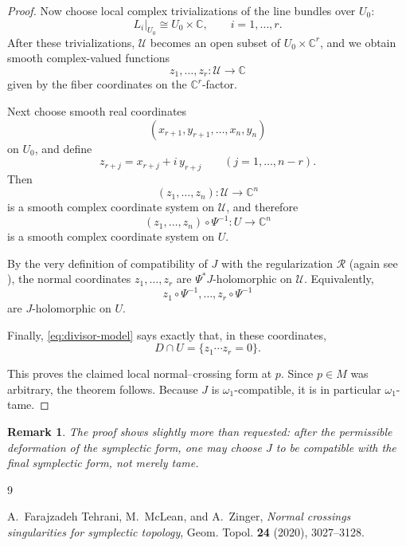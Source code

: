 \documentclass[11pt]{article}
\newtheorem{remark}[theorem]{Remark}
\begin{document}
\begin{proof}
Now choose local complex trivializations of the line bundles over $U_0$:
\[
L_i|_{U_0}\cong U_0\times \mathbb C,\qquad i=1,\dots,r.
\]
After these trivializations, $\mathcal U$ becomes an open subset of
$U_0\times \mathbb C^r$, and we obtain smooth complex-valued functions
\[
z_1,\dots,z_r\colon \mathcal U\to \mathbb C
\]
given by the fiber coordinates on the $\mathbb C^r$-factor.

Next choose smooth real coordinates
\[
(x_{r+1},y_{r+1},\dots,x_n,y_n)
\]
on $U_0$, and define
\[
z_{r+j}=x_{r+j}+i\,y_{r+j}\qquad (j=1,\dots,n-r).
\]
Then
\[
(z_1,\dots,z_n)\colon \mathcal U\to \mathbb C^n
\]
is a smooth complex coordinate system on $\mathcal U$, and therefore
\[
(z_1,\dots,z_n)\circ \Psi^{-1}\colon U\to \mathbb C^n
\]
is a smooth complex coordinate system on $U$.

By the very definition of compatibility of $J$ with the regularization
$\mathcal R$ (again see \cite[\S3]{TMZ}), the normal coordinates
$z_1,\dots,z_r$ are $\Psi^*J$-holomorphic on $\mathcal U$.
Equivalently,
\[
z_1\circ\Psi^{-1},\dots,z_r\circ\Psi^{-1}
\]
are $J$-holomorphic on $U$.

Finally, \eqref{eq:divisor-model} says exactly that, in these coordinates,
\[
D\cap U=\{z_1\cdots z_r=0\}.
\]

This proves the claimed local normal--crossing form at $p$.
Since $p\in M$ was arbitrary, the theorem follows.
Because $J$ is $\omega_1$-compatible, it is in particular $\omega_1$-tame.
\end{proof}

\begin{remark}
The proof shows slightly more than requested: after the permissible deformation
of the symplectic form, one may choose $J$ to be \emph{compatible} with the
final symplectic form, not merely tame.
\end{remark}

\begin{thebibliography}{9}

A.~Farajzadeh Tehrani, M.~McLean, and A.~Zinger,
\emph{Normal crossings singularities for symplectic topology},
Geom. Topol. \textbf{24} (2020), 3027--3128.

\end{thebibliography}
\end{document}
